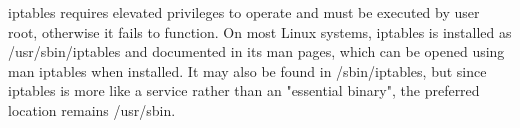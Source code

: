 iptables requires elevated privileges to operate and must be executed by user root, otherwise it fails to function. On most Linux systems, iptables is installed as /usr/sbin/iptables and documented in its man pages, which can be opened using man iptables when installed. It may also be found in /sbin/iptables, but since iptables is more like a service rather than an "essential binary", the preferred location remains /usr/sbin.

